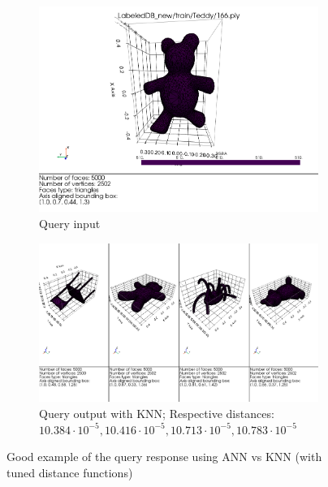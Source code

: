 \begin{figure}[H]
    \begin{subfigure}[b]{0.3\textwidth}
        \includegraphics[width=\textwidth]{assets/queries/ann_good/input.png}
        \caption{Query input \newline}
    \end{subfigure}
    \hfill
    \begin{subfigure}[b]{0.65\textwidth}
        \includegraphics[width=\textwidth]{assets/queries/ann_good/output_knn.png}
        \caption{Query output with KNN;  Respective distances: \newline $10.384\cdot10^{-5}, 10.416\cdot10^{-5}, 10.713\cdot10^{-5}, 10.783\cdot10^{-5}$}
    \end{subfigure}
    \caption{Good example of the query response using ANN vs KNN (with tuned distance functions)}
    \label{fig:query-response-example-ann-good}
\end{figure}

